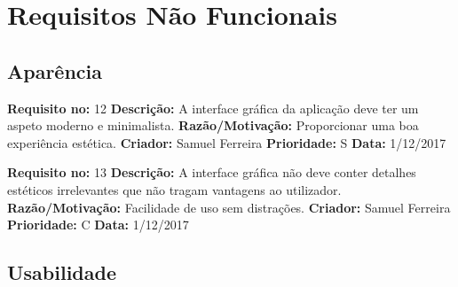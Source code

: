 \chapter{Requisitos Não Funcionais}

\section{Aparência}

\begin{framed}
\noindent\textbf{Requisito no:} 12
\vspace{2mm}
\newline\textbf{Descrição:} A interface gráfica da aplicação deve ter um aspeto moderno e minimalista.
\vspace{1mm}
\newline\textbf{Razão/Motivação:} Proporcionar uma boa experiência estética.
\vspace{1mm}
\newline\textbf{Criador:} Samuel Ferreira
\vspace{1mm}
\newline\textbf{Prioridade:} S
\vspace{1mm}
\newline\textbf{Data:} 1/12/2017
\end{framed}

\begin{framed}
\noindent\textbf{Requisito no:} 13
\vspace{2mm}
\newline\textbf{Descrição:} A interface gráfica não deve conter detalhes estéticos irrelevantes que não tragam vantagens ao utilizador.
\vspace{1mm}
\newline\textbf{Razão/Motivação:} Facilidade de uso sem distrações.
\vspace{1mm}
\newline\textbf{Criador:} Samuel Ferreira
\vspace{1mm}
\newline\textbf{Prioridade:} C
\vspace{1mm}
\newline\textbf{Data:} 1/12/2017
\end{framed}

\section{Usabilidade}


